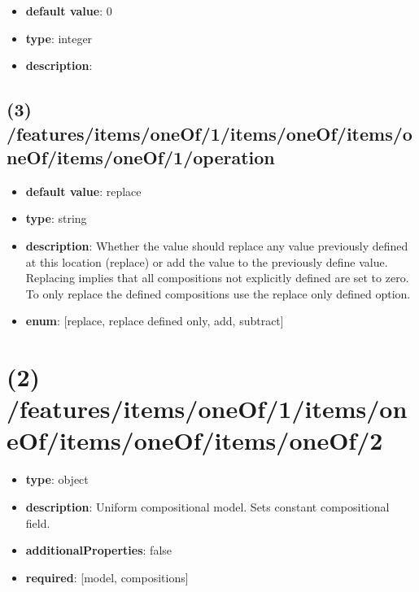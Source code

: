 \begin{itemize}[leftmargin=4em]\item {\bf default value}: 0
\item {\bf type}: integer
\item {\bf description}: 
\end{itemize}\subsection{(3) /features/items/oneOf/1/items/oneOf/items/oneOf/items/oneOf/1/operation}
\begin{itemize}[leftmargin=3em]\item {\bf default value}: replace
\item {\bf type}: string
\item {\bf description}: Whether the value should replace any value previously defined at this location (replace) or add the value to the previously define value. Replacing implies that all compositions not explicitly defined are set to zero. To only replace the defined compositions use the replace only defined option.
\item {\bf enum}: [replace, replace defined only, add, subtract]\end{itemize}\section{(2) /features/items/oneOf/1/items/oneOf/items/oneOf/items/oneOf/2}
\begin{itemize}[leftmargin=2em]\item {\bf type}: object
\item {\bf description}: Uniform compositional model. Sets constant compositional field.
\item {\bf additionalProperties}: false
\item {\bf required}: [model, compositions]\end{itemize}
